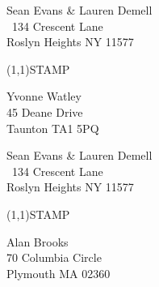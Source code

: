 \documentclass[12pt]{article}
\begin{document}
\clearpage

\begin{minipage}{.5\linewidth} \noindent
Sean Evans \& Lauren Demell\\\ 
134 Crescent Lane\\ 
Roslyn Heights NY 11577
\end{minipage}
\begin{minipage}{.5\linewidth \hspace{-.2in} \vspace{-.3in}}
\begin{flushright}
\framebox(1,1){STAMP}
\end{flushright}
\end{minipage}

\begin{center} \begin{Huge} \vspace*{\fill}
Yvonne Watley\\
45 Deane Drive\\
Taunton TA1 5PQ\\
\vspace{\fill} \end{Huge} \end{center}

\clearpage

\begin{minipage}{.5\linewidth} \noindent
Sean Evans \& Lauren Demell\\\ 
134 Crescent Lane\\ 
Roslyn Heights NY 11577
\end{minipage}
\begin{minipage}{.5\linewidth \hspace{-.2in} \vspace{-.3in}}
\begin{flushright}
\framebox(1,1){STAMP}
\end{flushright}
\end{minipage}

\begin{center} \begin{Huge} \vspace*{\fill}
Alan Brooks\\
70 Columbia Circle\\
Plymouth MA 02360\\
\vspace{\fill} \end{Huge} \end{center}

\clearpage
\end{document}
